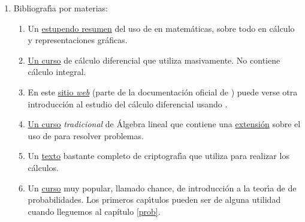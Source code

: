 \begin{enumerate}
 

 
 
 
 
 
 
 
 \item {\sc Bibliograf\'{\i}a por materias:}
\begin{enumerate}
 \item Un \href{http://150.244.21.37/PDFs/SAGE-DOCS/prep_tutorials.pdf}{estupendo resumen}
del uso de {\sage} en matem\'aticas, sobre todo en c\'alculo y representaciones
gr\'aficas.
 \item \href{http://150.244.21.37/PDFs/CAVAN/calculus1-with-sage.pdf}{Un curso} de
c\'alculo diferencial que utiliza  {\sage} masivamente. No contiene c\'alculo
integral. 
 
 \item En este \href{http://www.sagemath.org/calctut/}{sitio
 \itshape{web}} (parte de la documentaci\'on oficial de {\sage}) puede verse otra
 introducci\'on al estudio del c\'alculo diferencial usando {\sage}.
 
 
 
 
 \item \href{http://150.244.21.37/PDFs/CAVAN/fcla/fcla-3.20-print.pdf}{Un curso} {\itshape
tradicional} de \'Algebra lineal que contiene una
\href{http://150.244.21.37/PDFs/CAVAN/fcla/fcla-3.20-sage-6.0-primer.pdf}{extensi\'on} sobre el
uso de {\sage} para resolver problemas. 
\item Un \href{http://150.244.21.37/PDFs/CRIPT/kohel-book-2008.pdf}{texto} bastante completo de 
criptograf\'{\i}a que utiliza {\sage} para realizar los c\'alculos. 

\item Un \href{http://150.244.21.37/PDFs/PROBA/probability.pdf}{curso} muy popular, llamado
{\sc chance}, de introducci\'on a la teor\'{\i}a de de probabilidades. Los
primeros cap\'{\i}tulos pueden ser de alguna utilidad cuando lleguemos al
cap\'itulo \ref{prob}.


\end{enumerate}


 
  
 
 
 
\end{enumerate}









